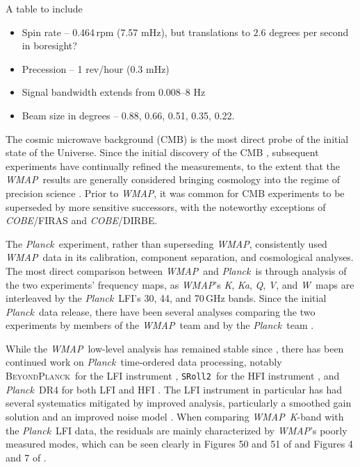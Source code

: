 \documentclass[twocolumn]{../../common/aa}
\def\WMAP{\emph{WMAP}}
\def\COBE{\emph{COBE}}
\def\planck{\emph{Planck}}
\def\Planck{\emph{Planck}}
\def\sroll2{\texttt{SRoll2}}
\newcommand{\bp}{\textsc{BeyondPlanck}}
\newcommand{\npipe}[0]{\texttt{NPIPE}}
\newcommand{\K}[0]{\textit K}
\newcommand{\Ka}[0]{\textit{Ka}}
\newcommand{\Q}[0]{\textit Q}
\newcommand{\V}[0]{\textit V}
\newcommand{\W}[0]{\textit W}
\begin{document}
A table to include
\begin{itemize}
	\item Spin rate -- 0.464\,rpm (7.57 mHz), but translations to $2.6$ degrees per second in boresight?
	\item Precession -- 1 rev/hour (0.3 mHz)
	\item Signal bandwidth extends from 0.008--8 Hz \citep{jarosik2003a}
	\item Beam size in degrees -- 0.88, 0.66, 0.51, 0.35, 0.22.
\end{itemize}


The cosmic microwave background (CMB) is the most direct probe of the initial state of the Universe. Since the initial discovery of the CMB \citep{penzias:1965}, subsequent experiments have continually refined the measurements, to the extent that the \WMAP\ results are generally considered bringing cosmology into the regime of precision science \citep{bennett2012}. Prior to \WMAP, it was common for CMB experiments to be superseded by more sensitive successors, with the noteworthy exceptions of \COBE/FIRAS and \COBE/DIRBE.

The \planck\ experiment, rather than superseding \WMAP, consistently used \WMAP\ data in its calibration, component separation, and cosmological analyses. The most direct comparison between \WMAP\ and \Planck\ is through analysis of the two experiments' frequency maps, as \WMAP's \K, \Ka, \Q, \V, and \W\ maps are interleaved by the \Planck\ LFI's 30, 44, and 70\,GHz bands. Since the initial \Planck\ data release, there have been several analyses comparing the two experiments by members of the \WMAP\ team \citep{larson2014,addison:2016,huang:2018,weiland:2018,weiland:2022} and by the \Planck\ team \citep{planck2014-a13,planck2016-l06,planck2016-l05}.

While the \WMAP\ low-level analysis has remained stable since \citet{bennett2012}, there has been continued work on \Planck\ time-ordered data processing, notably \bp\ for the LFI instrument \citep{bp01}, \sroll2\ for the HFI instrument \citep{delouis:2019}, and \Planck\ DR4 for both LFI and HFI \citep[\npipe,][]{npipe}. The LFI instrument in particular has had several systematics mitigated by improved analysis, particularly a smoothed gain solution and an improved noise model \citep{npipe,bp06,bp07,bp10}. When comparing \WMAP\ \K-band with the \Planck\ LFI data, the residuals are mainly characterized by \WMAP's poorly measured modes, which can be seen clearly in Figures 50 and 51 of \citet{npipe} and Figures 4 and 7 of \citet{bp14}.
\end{document}
